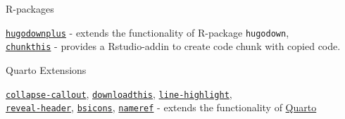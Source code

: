 


\begin{cvskills}
  \cvskill
    {R-packages} 
    {\parbox{\textwidth}{\linespread{1.1}\selectfont \href{https://timteafan.github.io/hugodownplus/}{\texttt{hugodownplus}} - extends the functionality of R-package \texttt{hugodown}, \\ \href{https://github.com/shafayetShafee/chunkthis}{\texttt{chunkthis}} - provides a Rstudio-addin to create code chunk with copied code.}
    }%

  \cvskill
    {Quarto Extensions} %
    {\parbox{\textwidth}{\linespread{1.1}\selectfont \href{https://github.com/shafayetShafee/collapse-callout}{\texttt{collapse-callout}}, \href{https://github.com/shafayetShafee/downloadthis}{\texttt{downloadthis}}, \href{https://github.com/shafayetShafee/line-highlight}{\texttt{line-highlight}}, \\ \href{https://github.com/shafayetShafee/reveal-header}{\texttt{reveal-header}}, \href{https://github.com/shafayetShafee/bsicons}{\texttt{bsicons}}, \href{https://github.com/shafayetShafee/nameref}{\texttt{nameref}} - extends the functionality of \href{https://quarto.org/}{Quarto}}} %


\end{cvskills}